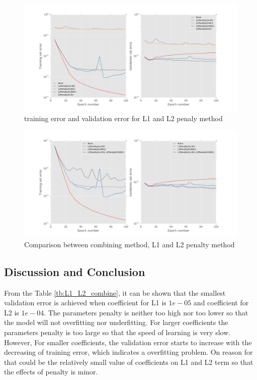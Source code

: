 \documentclass[11pt]{article}
\begin{document}
\begin{figure}[htp]
\centering 
  \includegraphics[width=1\textwidth]{baseline_L1_L2.pdf}
  \caption{training error and validation error for L1 and L2 penaly method}
  \label{fg:L1_L2_combine}
\end{figure}

\begin{figure}[htp]
\centering 
  \includegraphics[width=1\textwidth]{L1_L2_with_all.pdf}
  \caption{Comparison between combining method, L1 and L2 penalty method}
  \label{fg:L1_L2_compare}
\end{figure}


\subsection{Discussion and Conclusion}
From the Table \ref{tb:L1_L2_combine}, it can be shown that the smallest validation error is achieved when coefficient for L1 is $1e-05$ and coefficient for L2 is $1e-04$. The parameters penalty is neither too high nor too lower so that the model will not overfitting nor underfitting. For larger coefficients the parameters penalty is too large so that the speed of learning is very slow. However, For smaller coefficients, the validation error starts to increase with the decreasing of training error, which indicates a overfitting problem. On reason for that could be the relatively small value of coefficients on L1 and L2 term so that the effects of penalty is minor.
\end{document}
